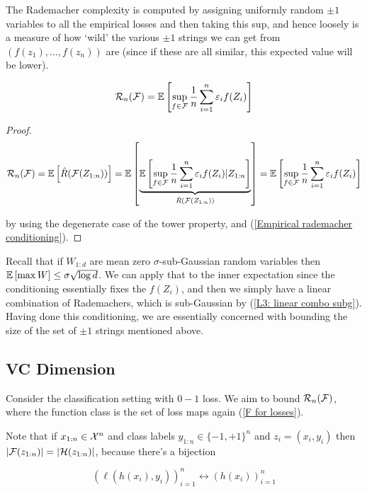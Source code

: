 \documentclass[11pt]{scrartcl}
\begin{document}
The Rademacher complexity is computed by assigning uniformly random $\pm1$ variables to all the empirical losses and then taking this sup, and hence loosely is a measure of how `wild' the various $\pm1$ strings we can get from $(f(z_1), ... , f(z_n))$ are (since if these are all similar, this expected value will be lower).


\begin{theorem}
\begin{equation}
    \mathcal{R}_n(\mathcal{F}) = \mathbb{E} \left[  \sup_{f \in \mathcal{F}} \frac1n \sum_{i=1}^n \varepsilon_i f(Z_i) \right]
\end{equation}

\begin{proof}
\begin{equation}
    \mathcal{R}_n(\mathcal{F}) = \mathbb{E} \left[ \hat{R}(\mathcal{F}(Z_{1:n})) \right] = \mathbb{E} \left[  \underbrace{\mathbb{E} \left[  \sup_{f \in \mathcal{F}} \frac1n \sum_{i=1}^n \varepsilon_i f(Z_i) | Z_{1:n}  \right]}_{\hat{R}(\mathcal{F}(Z_{1:n}))} \right] = \mathbb{E} \left[  \sup_{f \in \mathcal{F}} \frac1n \sum_{i=1}^n \varepsilon_i f(Z_i) \right]
\end{equation}

by using the degenerate case of the tower property, and (\ref{Empirical rademacher conditioning}).
\end{proof}
\end{theorem}

Recall that if $W_{1:d}$ are mean zero $\sigma$-sub-Gaussian random variables then $\mathbb{E} \left[ \max W \right] \le \sigma \sqrt{\log d}$. We can apply that to the inner expectation since the conditioning essentially fixes the $f(Z_i)$, and then we simply have a linear combination of Rademachers, which is sub-Gaussian by (\ref{L3: linear combo subg}). Having done this conditioning, we are essentially concerned with bounding the size of the set of $\pm 1$ strings mentioned above. 

\subsection{VC Dimension}

Consider the classification setting with $0-1$ loss. We aim to bound $\mathcal{R}_n(\mathcal{F})$, where the function class is the set of loss maps again (\ref{F for losses}).

Note that if $x_{1:n} \in \mathcal{X}^n$ and class labels $y_{1:n} \in \{ -1, +1 \}^n$ and $z_i = (x_i, y_i)$ then $|\mathcal{F}(z_{1:n})| = |\mathcal{H}(z_{1:n})|$, because there's a bijection

\begin{equation}
    ( \ell(h(x_i), y_i) )_{i=1}^n \leftrightarrow ( h(x_i) )_{i=1}^n
\end{equation}
\end{document}
